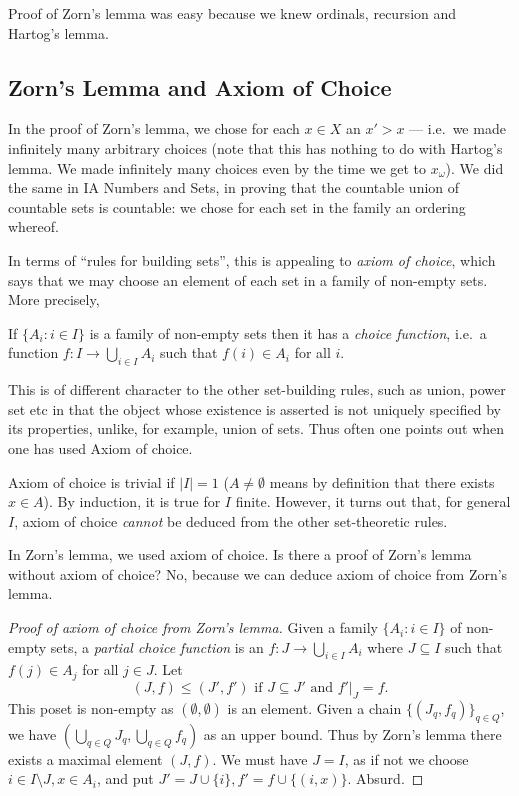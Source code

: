 \documentclass[a4paper]{article}
\begin{document}
\begin{remark}
  Proof of Zorn's lemma was easy because we knew ordinals, recursion  and Hartog's lemma.
\end{remark}

\subsection{Zorn's Lemma and Axiom of Choice}

In the proof of Zorn's lemma, we chose for each \(x \in X\) an \(x' > x\) --- i.e.\ we made infinitely many arbitrary choices (note that this has nothing to do with Hartog's lemma. We made infinitely many choices even by the time we get to \(x_\omega\)). We did the same in IA Numbers and Sets, in proving that the countable union of countable sets is countable: we chose for each set in the family an ordering whereof.

In terms of ``rules for building sets'', this is appealing to \emph{axiom of choice}, which says that we may choose an element of each set in a family of non-empty sets. More precisely,

\begin{axiom}
  If \(\{A_i: i \in I\}\) is a family of non-empty sets then it has a \emph{choice function}, i.e.\ a function \(f: I \to \bigcup_{i \in I} A_i\) such that \(f(i) \in A_i\) for all \(i\).
\end{axiom}

This is of different character to the other set-building rules, such as union, power set etc in that the object whose existence is asserted is not uniquely specified by its properties, unlike, for example, union of sets. Thus often one points out when one has used Axiom of choice.

\begin{remark}
  Axiom of choice is trivial if \(|I| = 1\) (\(A \neq \emptyset\) means by definition that there exists \(x \in A\)). By induction, it is true for \(I\) finite. However, it turns out that, for general \(I\), axiom of choice \emph{cannot} be deduced from the other set-theoretic rules.
\end{remark}

In Zorn's lemma, we used axiom of choice. Is there a proof of Zorn's lemma without axiom of choice? No, because we can deduce axiom of choice from Zorn's lemma.

\begin{proof}[Proof of axiom of choice from Zorn's lemma]
  Given a family \(\{A_i: i \in I\}\) of non-empty sets, a \emph{partial choice function} is an \(f: J \to \bigcup_{i \in I} A_i\) where \(J \subseteq I\) such that \(f(j) \in A_j\) for all \(j \in J\). Let
  \[
    (J, f) \leq (J', f') \text{ if } J \subseteq J' \text{ and } f'|_J = f.
  \]
  This poset is non-empty as \((\emptyset, \emptyset)\) is an element. Given a chain \(\{(J_q, f_q)\}_{q \in Q}\), we have \((\bigcup_{q \in Q} J_q, \bigcup_{q \in Q} f_q)\) as an upper bound. Thus by Zorn's lemma there exists a maximal element \((J, f)\). We must have \(J = I\), as if not we choose \(i \in I \setminus J, x \in A_i\), and put \(J' = J \cup \{i\}, f' = f \cup \{(i, x)\}\). Absurd.
\end{proof}
\end{document}
